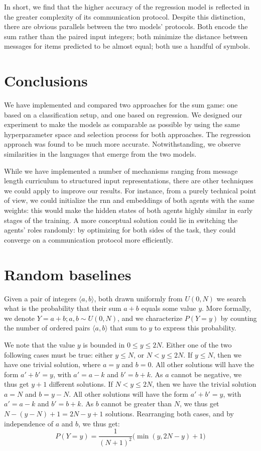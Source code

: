 \documentclass[twocolumn]{article}
\begin{document}
In short, we find that the higher accuracy of the regression model is reflected in the greater complexity of its communication protocol.
Despite this distinction, there are obvious parallels between the two models' protocols.
Both encode the sum rather than the paired input integers; both minimize the distance between messages for items predicted to be almost equal; both use a handful of symbols.

\section{Conclusions}
We have implemented and compared two approaches for the sum game: one based on a classification setup, and one based on regression.
We designed our experiment to make the models as comparable as possible by using the same hyperparameter space and selection process for both approaches.
The regression approach was found to be much more accurate.
Notwithstanding, we observe similarities in the languages that emerge from the two models.

While we have implemented a number of mechanisms ranging from message length curriculum to structured input representations, there are other techniques we could apply to improve our results.
For instance, from a purely technical point of view, we could initialize the {\sc rnn} and embeddings of both agents with the same weights: this would make the hidden states of both agents highly similar in early stages of the training.
A more conceptual solution could lie in switching the agents' roles randomly: by optimizing for both sides of the task, they could converge on a communication protocol more efficiently.

\appendix

\section{Random baselines} \label{sec:baselines}

Given a pair of integers $\langle a,b \rangle$, both drawn uniformly from $U(0, N)$ we search what is the probability that their sum $a+b$ equals some value $y$.
More formally, we denote $Y = a+b ; a, b \sim U(0, N)$, and we characterize $P(Y=y)$ by counting the number of ordered pairs $\langle a,b \rangle$ that sum to $y$ to express this probability.

We note that the value $y$ is bounded in $0 \leq y \leq 2N$. 
Either one of the two following cases must be true: either $y \leq N$, or $N < y \leq 2N$.
If  $y \leq N$, then we have one trivial solution, where $a=y$ and $b=0$. 
All other solutions will have the form $a'+b'=y$, with $a'=a-k$ and $b'=b+k$.
As $a$ cannot be negative, we thus get $y+1$ different solutions.
If $N < y \leq 2N$, then we have the trivial solution $a=N$ and $b=y-N$.
All other solutions will have the form $a'+b'=y$, with $a'=a-k$ and $b'=b+k$.
As $b$ cannot be greater than $N$, we thus get $N - (y - N) + 1= 2N - y + 1$ solutions.
Rearranging both cases, and by independence of $a$ and $b$, we thus get:
\begin{equation*}
    P(Y=y) = \frac{1}{(N+1)^2}\bigg(\min(y, 2N - y) + 1\bigg)
\end{equation*}
\end{document}
